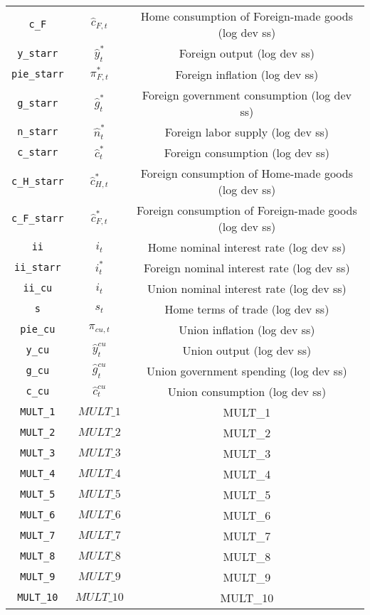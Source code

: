 \begin{center}
\begin{longtable}{ccc}
\texttt{c\_F} & ${\hat c_{F,t}}$ & Home consumption of Foreign-made goods (log dev ss)\\
\texttt{y\_starr} & ${\hat y_t^*}$ & Foreign output (log dev ss)\\
\texttt{pie\_starr} & ${\pi_{F,t}^*}$ & Foreign inflation (log dev ss)\\
\texttt{g\_starr} & ${\hat g_t^*}$ & Foreign government consumption (log dev ss)\\
\texttt{n\_starr} & ${\hat n_t^*}$ & Foreign labor supply (log dev ss)\\
\texttt{c\_starr} & ${\hat c_t^*}$ & Foreign consumption (log dev ss)\\
\texttt{c\_H\_starr} & ${\hat c_{H,t}^*}$ & Foreign consumption of Home-made goods (log dev ss)\\
\texttt{c\_F\_starr} & ${\hat c_{F,t}^*}$ & Foreign consumption of Foreign-made goods (log dev ss)\\
\texttt{ii} & ${i_t}$ & Home nominal interest rate (log dev ss)\\
\texttt{ii\_starr} & ${i_t^*}$ & Foreign nominal interest rate (log dev ss)\\
\texttt{ii\_cu} & ${i_t}$ & Union nominal interest rate (log dev ss)\\
\texttt{s} & ${s_t}$ & Home terms of trade (log dev ss)\\
\texttt{pie\_cu} & ${\pi_{cu,t}}$ & Union inflation (log dev ss)\\
\texttt{y\_cu} & ${\hat y_t^{cu}}$ & Union output (log dev ss)\\
\texttt{g\_cu} & ${\hat g_t^{cu}}$ & Union government spending (log dev ss)\\
\texttt{c\_cu} & ${\hat c_t^{cu}}$ & Union consumption (log dev ss)\\
\texttt{MULT\_1} & $MULT\_1$ & MULT\_1\\
\texttt{MULT\_2} & $MULT\_2$ & MULT\_2\\
\texttt{MULT\_3} & $MULT\_3$ & MULT\_3\\
\texttt{MULT\_4} & $MULT\_4$ & MULT\_4\\
\texttt{MULT\_5} & $MULT\_5$ & MULT\_5\\
\texttt{MULT\_6} & $MULT\_6$ & MULT\_6\\
\texttt{MULT\_7} & $MULT\_7$ & MULT\_7\\
\texttt{MULT\_8} & $MULT\_8$ & MULT\_8\\
\texttt{MULT\_9} & $MULT\_9$ & MULT\_9\\
\texttt{MULT\_10} & $MULT\_10$ & MULT\_10\\

\end{longtable}
\end{center}
